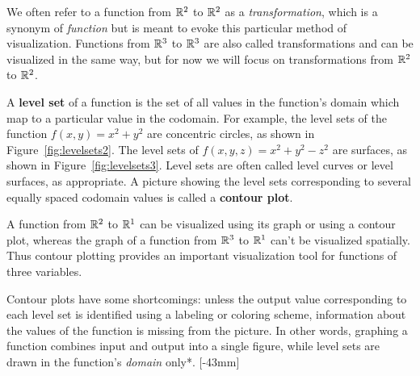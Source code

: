 \documentclass[prettycode,shellescape]{watsonbook}
\begin{document}
We often refer to a function from $\mathbb{R}^2$ to $\mathbb{R}^2$ as a
\textit{transformation}, which is a synonym of \textit{function}
but is meant to evoke this particular method of
visualization. Functions from $\mathbb{R}^3$ to $\mathbb{R}^3$ are also called
transformations and can be visualized in the same way, but for now we
will focus on transformations from $\mathbb{R}^2$ to $\mathbb{R}^2$.

A \textbf{level set} of a function is the set of all values in the
function's domain which map to a particular value in the codomain. For
example, the level sets of the function $f(x,y) = x^2 + y^2$ are
concentric circles, as shown in Figure~\ref{fig:levelsets2}. The level
sets of $f(x,y,z) = x^2 + y^2 - z^2$ are surfaces, as shown in
Figure~\ref{fig:levelsets3}. Level sets are often called level curves
or level surfaces, as appropriate. A picture showing the level sets
corresponding to several equally spaced codomain values is called a
\textbf{contour plot}.

A function from $\mathbb{R}^2$ to $\mathbb{R}^1$ can be visualized using its graph or
using a contour plot, whereas the graph of a function from $\mathbb{R}^3$ to
$\mathbb{R}^1$ can't be visualized spatially. Thus contour plotting provides
an important visualization tool for functions of three variables.

Contour plots have some shortcomings: unless the output value
corresponding to each level set is identified using a labeling or
coloring scheme, information about the values of the function is
missing from the picture. In other words, graphing a function combines
input and output into a single figure, while level sets are drawn in
the function's \textit{domain} only*. [-43mm]
\end{document}
